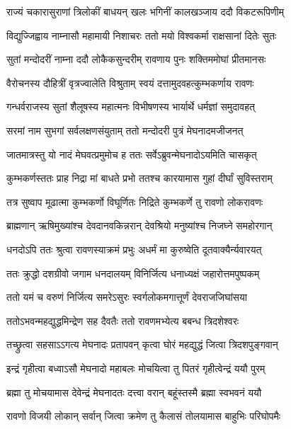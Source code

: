 \twolineshloka
{राज्यं चकारासुराणां त्रिलोकीं बाधयन् खलः}
{भगिनीं कालखञ्जाय ददौ विकटरूपिणीम्} %

\twolineshloka
{विद्युज्जिह्वाय नाम्नासौ महामायी निशाचरः}
{ततो मयो विश्वकर्मा राक्षसानां दितेः सुतः} %

\twolineshloka
{सुतां मन्दोदरीं नाम्ना ददौ लोकैकसुन्दरीम्}
{रावणाय पुनः शक्तिममोघां प्रीतमानसः} %

\twolineshloka
{वैरोचनस्य दौहित्रीं वृत्रज्वालेति विश्रुताम्}
{स्वयं दत्तामुदवहत्कुम्भकर्णाय रावणः} %

\twolineshloka
{गन्धर्वराजस्य सुतां शैलूषस्य महात्मनः}
{विभीषणस्य भार्यार्थे धर्मज्ञां समुदावहत्} %

\twolineshloka
{सरमां नाम सुभगां सर्वलक्षणसंयुताम्}
{ततो मन्दोदरी पुत्रं मेघनादमजीजनत्} %

\twolineshloka
{जातमात्रस्तु यो नादं मेघवत्प्रमुमोच ह}
{ततः सर्वेऽब्रुवन्मेघनादोऽयमिति चासकृत्} %

\twolineshloka
{कुम्भकर्णस्ततः प्राह निद्रा मां बाधते प्रभो}
{ततश्च कारयामास गुहां दीर्घां सुविस्तराम्} %

\twolineshloka
{तत्र सुष्वाप मूढात्मा कुम्भकर्णो विघूर्णितः}
{निद्रिते कुम्भकर्णे तु रावणो लोकरावणः} %

\twolineshloka
{ब्राह्मणान् ऋषिमुख्यांश्च देवदानवकिन्नरान्}
{देवश्रियो मनुष्यांश्च निजघ्ने समहोरगान्} %

\twolineshloka
{धनदोऽपि ततः श्रुत्वा रावणस्याक्रमं प्रभुः}
{अधर्मं मा कुरुष्वेति दूतवाक्यैर्न्यवारयत्} %

\twolineshloka
{ततः क्रुद्धो दशग्रीवो जगाम धनदालयम्}
{विनिर्जित्य धनाध्यक्षं जहारोत्तमपुष्पकम्} %

\twolineshloka
{ततो यमं च वरुणं निर्जित्य समरेऽसुरः}
{स्वर्गलोकमगात्तूर्णं देवराजजिघांसया} %

\twolineshloka
{ततोऽभवन्महद्युद्धमिन्द्रेण सह दैवतैः}
{ततो रावणमभ्येत्य बबन्ध त्रिदशेश्वरः} %

\twolineshloka
{तच्छ्रुत्वा सहसाऽऽगत्य मेघनादः प्रतापवन्}
{कृत्वा घोरं महद्युद्धं जित्वा त्रिदशपुङ्गवान्} %

\twolineshloka
{इन्द्रं गृहीत्वा बध्वाऽसौ मेघनादो महाबलः}
{मोचयित्वा तु पितरं गृहीत्वेन्द्रं ययौ पुरम्} %

\twolineshloka
{ब्रह्मा तु मोचयामास देवेन्द्रं मेघनादतः}
{दत्त्वा वरान् बहूंस्तस्मै ब्रह्मा स्वभवनं ययौ} %

\twolineshloka
{रावणो विजयी लोकान् सर्वान् जित्वा क्रमेण तु}
{कैलासं तोलयामास बाहुभिः परिघोपमैः} %

